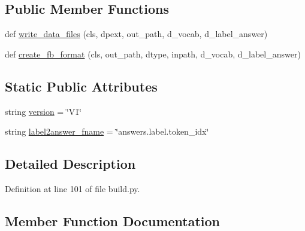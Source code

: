 \subsection*{Public Member Functions}
\begin{DoxyCompactItemize}
\item 
def \hyperlink{classparlai_1_1tasks_1_1insuranceqa_1_1build_1_1ParseInsuranceQAV1_aec860cdc7404febddbbc3434828c74e3}{write\+\_\+data\+\_\+files} (cls, dpext, out\+\_\+path, d\+\_\+vocab, d\+\_\+label\+\_\+answer)
\item 
def \hyperlink{classparlai_1_1tasks_1_1insuranceqa_1_1build_1_1ParseInsuranceQAV1_a67191000b24f2d3f3be641c5221b9a30}{create\+\_\+fb\+\_\+format} (cls, out\+\_\+path, dtype, inpath, d\+\_\+vocab, d\+\_\+label\+\_\+answer)
\end{DoxyCompactItemize}
\subsection*{Static Public Attributes}
\begin{DoxyCompactItemize}
\item 
string \hyperlink{classparlai_1_1tasks_1_1insuranceqa_1_1build_1_1ParseInsuranceQAV1_a2c80c19256c2c59a2c29ffc88e125165}{version} = \char`\"{}V1\char`\"{}
\item 
string \hyperlink{classparlai_1_1tasks_1_1insuranceqa_1_1build_1_1ParseInsuranceQAV1_a6d912e89848985844b85a5c6f2943f5e}{label2answer\+\_\+fname} = \char`\"{}answers.\+label.\+token\+\_\+idx\char`\"{}
\end{DoxyCompactItemize}


\subsection{Detailed Description}


Definition at line 101 of file build.\+py.



\subsection{Member Function Documentation}
\mbox{\label{classparlai_1_1tasks_1_1insuranceqa_1_1build_1_1ParseInsuranceQAV1_a67191000b24f2d3f3be641c5221b9a30}} 
